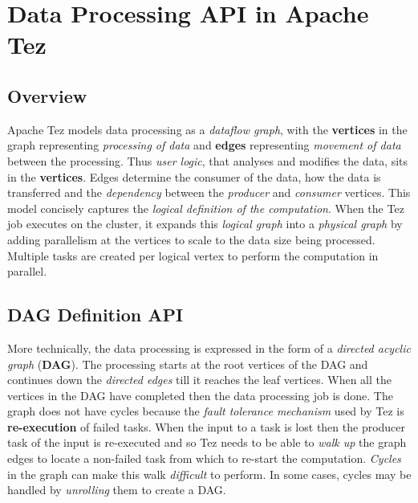 \documentclass[twocolumn]{article}
\begin{document}


\section{Data Processing API in Apache Tez}
\subsection{Overview}

Apache Tez models data processing as a \emph{dataflow graph}, with the
\textbf{vertices} in the graph representing \emph{processing of data}
and \textbf{edges} representing \emph{movement of data} between the
processing. Thus \emph{user logic}, that analyses and modifies the data,
sits in the \textbf{vertices}. Edges determine the consumer of the data,
how the data is transferred and the \emph{dependency} between the
\emph{producer} and \emph{consumer} vertices. This model concisely
captures the \emph{logical definition of the computation}. When the Tez
job executes on the cluster, it expands this \emph{logical graph} into a
\emph{physical graph} by adding parallelism at the vertices to scale to
the data size being processed. Multiple tasks are created per logical
vertex to perform the computation in parallel.

\subsection{DAG Definition API}

More technically, the data processing is expressed in the form of a
\emph{directed acyclic graph} (\textbf{DAG}). The processing starts at
the root vertices of the DAG and continues down the \emph{directed
edges} till it reaches the leaf vertices. When all the vertices in the
DAG have completed then the data processing job is done. The graph does
not have cycles because the \emph{fault tolerance mechanism} used by Tez
is \textbf{re-execution} of failed tasks. When the input to a task is
lost then the producer task of the input is re-executed and so Tez needs
to be able to \emph{walk up} the graph edges to locate a non-failed task
from which to re-start the computation. \emph{Cycles} in the graph can
make this walk \emph{difficult} to perform. In some cases, cycles may be
handled by \emph{unrolling} them to create a DAG.
\end{document}
